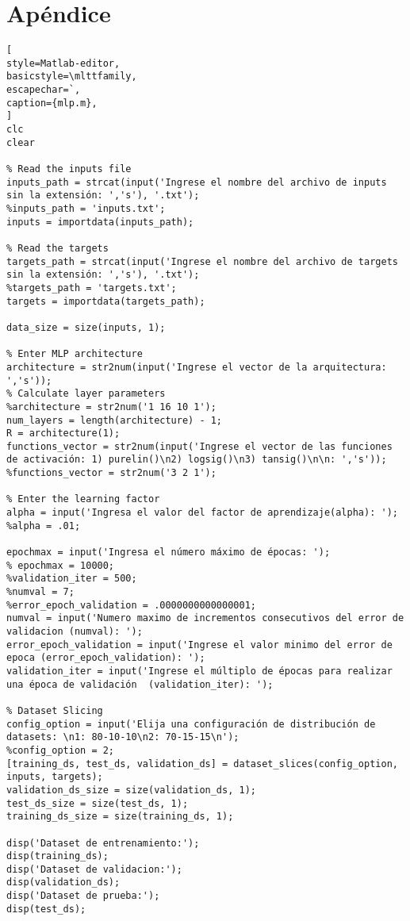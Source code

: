 \documentclass[6pt]{article}
\begin{document}
\section{Apéndice}
\begin{lstlisting}[
style=Matlab-editor,
basicstyle=\mlttfamily,
escapechar=`,
caption={mlp.m},
]
clc
clear

% Read the inputs file
inputs_path = strcat(input('Ingrese el nombre del archivo de inputs sin la extensión: ','s'), '.txt');
%inputs_path = 'inputs.txt';
inputs = importdata(inputs_path);

% Read the targets
targets_path = strcat(input('Ingrese el nombre del archivo de targets sin la extensión: ','s'), '.txt');
%targets_path = 'targets.txt';
targets = importdata(targets_path);

data_size = size(inputs, 1);

% Enter MLP architecture
architecture = str2num(input('Ingrese el vector de la arquitectura: ','s'));
% Calculate layer parameters
%architecture = str2num('1 16 10 1');
num_layers = length(architecture) - 1;
R = architecture(1);
functions_vector = str2num(input('Ingrese el vector de las funciones de activación: 1) purelin()\n2) logsig()\n3) tansig()\n\n: ','s'));
%functions_vector = str2num('3 2 1');

% Enter the learning factor
alpha = input('Ingresa el valor del factor de aprendizaje(alpha): ');
%alpha = .01;

epochmax = input('Ingresa el número máximo de épocas: ');
% epochmax = 10000;
%validation_iter = 500;
%numval = 7;
%error_epoch_validation = .0000000000000001;
numval = input('Numero maximo de incrementos consecutivos del error de validacion (numval): ');
error_epoch_validation = input('Ingrese el valor minimo del error de epoca (error_epoch_validation): ');
validation_iter = input('Ingrese el múltiplo de épocas para realizar una época de validación  (validation_iter): ');

% Dataset Slicing
config_option = input('Elija una configuración de distribución de datasets: \n1: 80-10-10\n2: 70-15-15\n');
%config_option = 2;
[training_ds, test_ds, validation_ds] = dataset_slices(config_option, inputs, targets);
validation_ds_size = size(validation_ds, 1);
test_ds_size = size(test_ds, 1);
training_ds_size = size(training_ds, 1);

disp('Dataset de entrenamiento:');
disp(training_ds);
disp('Dataset de validacion:');
disp(validation_ds);
disp('Dataset de prueba:');
disp(test_ds);


\end{lstlisting}
\end{document}

